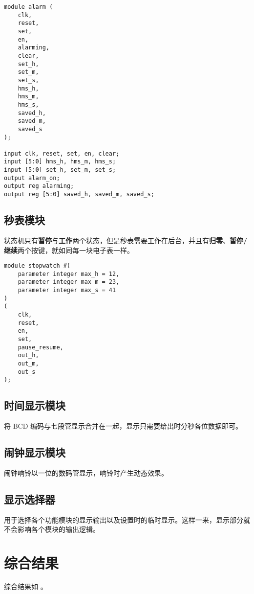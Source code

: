 \documentclass[lang=cn,11pt,a4paper,cite=authoryear]{elegantpaper}
\begin{document}
\begin{lstlisting}[caption={闹钟模块端口定义}]
module alarm (
    clk,
    reset,
    set,
    en,
    alarming,
    clear,
    set_h,
    set_m,
    set_s,
    hms_h,
    hms_m,
    hms_s,
    saved_h, 
    saved_m, 
    saved_s
);

input clk, reset, set, en, clear;
input [5:0] hms_h, hms_m, hms_s;
input [5:0] set_h, set_m, set_s;
output alarm_on;
output reg alarming;
output reg [5:0] saved_h, saved_m, saved_s;
\end{lstlisting}
    
\subsection{秒表模块}

状态机只有\textbf{暂停}与\textbf{工作}两个状态，但是秒表需要工作在后台，并且有\textbf{归零}、\textbf{暂停/继续}两个按键，就如同每一块电子表一样。


\begin{lstlisting}[caption={闹钟模块端口定义}]
module stopwatch #(
    parameter integer max_h = 12,
    parameter integer max_m = 23,
    parameter integer max_s = 41
) 
(
    clk,
    reset,
    en,
    set,
    pause_resume,
    out_h,
    out_m,
    out_s
);
\end{lstlisting}

\subsection{时间显示模块}

将 BCD 编码与七段管显示合并在一起，显示只需要给出时分秒各位数据即可。

\subsection{闹钟显示模块}

闹钟响铃以一位的数码管显示，响铃时产生动态效果。

\subsection{显示选择器}

用于选择各个功能模块的显示输出以及设置时的临时显示。这样一来，显示部分就不会影响各个模块的输出逻辑。

\section{综合结果}

综合结果如  。


\end{document}
